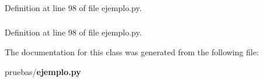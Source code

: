 \subsubsection[{datebox}]{}\label{classpruebas_1_1ejemplo_1_1_start_window_a0fb72a48582156c7362baa9d37f94f58}


\-Definition at line 98 of file ejemplo.\-py.

\subsubsection[{label\-\_\-date}]{}\label{classpruebas_1_1ejemplo_1_1_start_window_a45fed6596c3f2d33b1a7eb2c408dc198}


\-Definition at line 98 of file ejemplo.\-py.



\-The documentation for this class was generated from the following file\-:\begin{DoxyCompactItemize}
\item 
pruebas/{\bf ejemplo.\-py}\end{DoxyCompactItemize}
